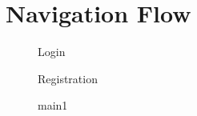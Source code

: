 \documentclass[a4paper,14pt,onecolumn]{report}
\begin{document}
	\section{Navigation Flow}
	
	\begin{center}
		\begin{figure}[!htbp]
			\centering
			\caption{Login}
			\label{fig:Login}
		\end{figure}
	\end{center} 
	
	\begin{center}
		\begin{figure}[!htbp]
			\centering
			\caption{Registration}
			\label{fig:Registration}
		\end{figure}
	\end{center} 
	
	\begin{center}
		\begin{figure}[!htbp]
			\centering
			\caption{main1}
			\label{fig:main1}
		\end{figure}
	\end{center} 
	
\end{document}
